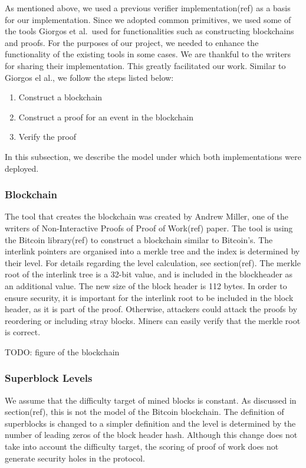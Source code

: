 As mentioned above, we used a previous verifier implementation(ref) as
a basis for our implementation. Since we adopted common primitives, we
used some of the tools Giorgos et al.\ used for functionalities such as
constructing blockchains and proofs. For the purposes of our project,
we needed to enhance the functionality of the existing tools in some
cases. We are thankful to the writers for sharing their
implementation. This greatly facilitated our work. Similar to Giorgos
el al., we follow the steps listed below:

\begin{enumerate}
    \item
        Construct a blockchain
    \item
        Construct a proof for an event in the blockchain
    \item
        Verify the proof
\end{enumerate}

In this subsection, we describe the model under which both
implementations were deployed.

\subsubsection{Blockchain}

The tool that creates the blockchain was created by Andrew Miller, one
of the writers of Non-Interactive Proofs of Proof of Work(ref) paper.
The tool is using the Bitcoin library(ref) to construct a blockchain
similar to Bitcoin’s. The interlink pointers are organised into a
merkle tree and the index is determined by their level. For details
regarding the level calculation, see section(ref). The merkle root of
the interlink tree is a 32-bit value, and is included in the
blockheader as an additional value. The new size of the block header
is 112 bytes. In order to ensure security, it is important for the
interlink root to be included in the block header, as it is part of
the proof. Otherwise, attackers could attack the proofs by reordering
or including stray blocks. Miners can easily verify that the merkle
root is correct.

TODO: figure of the blockchain

\subsubsection{Superblock Levels}

We assume that the difficulty target of mined blocks is constant. As
discussed in section(ref), this is not the model of the Bitcoin
blockchain. The definition of superblocks is changed to a simpler
definition and the level is determined by the number of leading zeros
of the block header hash. Although this change does not take into
account the difficulty target, the scoring of proof of work does not
generate security holes in the protocol.

